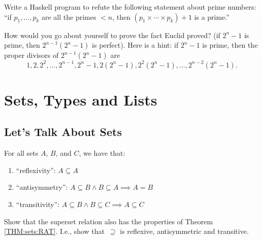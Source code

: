 \documentclass{report}
\begin{document}
\begin{Exercise} [number=39]
Write a Haskell program to refute the following statement about prime numbers: ``if $p_1, \dots, p_k$ are all the primes $< n$, then $(p_1 \times \cdots \times p_k) + 1$ is a prime.''
\end{Exercise}

\begin{Exercise} [number=41]
How would you go about yourself to prove the fact Euclid proved? (if $2^n - 1$ is prime, then $2^{n-1}(2^n - 1)$ is perfect). Here is a hint: if $2^n - 1$ is prime, then the proper divisors of $2^{n-1}(2^n - 1)$ are
\begin{displaymath}
1, 2, 2^2, \dots, 2^{n-1}, 2^n - 1, 2(2^n - 1), 2^2(2^n - 1), \dots, 2^{n-2}(2^n - 1).
\end{displaymath}
\end{Exercise}

\begin{Exercise} [number=42]

\end{Exercise}

\begin{Exercise} [number=43]

\end{Exercise}



\chapter{Sets, Types and Lists}
\section{Let's Talk About Sets}

\begin{theorem}
  \label{THM:sets:RAT}
  For all sets $A$, $B$, and $C$, we have that:
  \begin{enumerate}
    \item ``reflexivity'': $A \subseteq A$ 
    \item ``antisymmetry'': $A \subseteq B \land B \subseteq A \implies A = B$ 
    \item ``transitivity'': $A \subseteq B \land B \subseteq C \implies A \subseteq C$ 
  \end{enumerate}
\end{theorem}

\begin{Exercise} [number=2]
  Show that the superset relation also has the properties of Theorem \ref{THM:sets:RAT}. I.e., show that~$\supseteq$ is reflexive, antisymmetric and transitive.
\end{Exercise}
\end{document}
